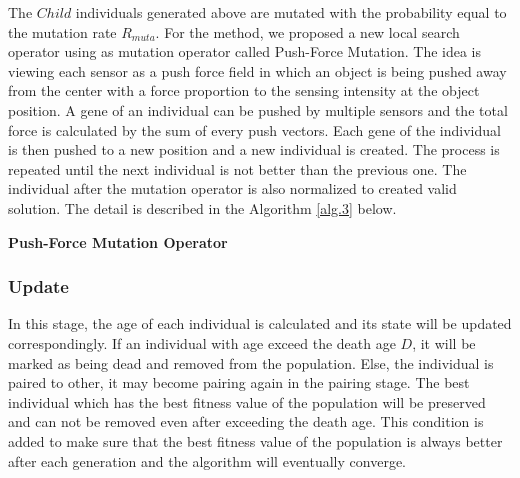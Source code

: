 \documentclass[final]{elsarticle}
\begin{document}
The $Child$ individuals generated above are mutated with the probability equal to the mutation rate $R_{muta}$. For the method, we proposed a new local search operator using as mutation operator called Push-Force Mutation. The idea is viewing each sensor as a push force field in which an object is being pushed away from the center with a force proportion to the sensing intensity at the object position. A gene of an individual can be pushed by multiple sensors and the total force is calculated by the sum of every push vectors. Each gene of the individual is then pushed to a new position and a new individual is created. The process is repeated until the next individual is not better than the previous one. The individual after the mutation operator is also normalized to created valid solution. The detail is described in the Algorithm \ref{alg.3} below.
\begin{algorithm}[H]
	\SetAlgoLined
	\caption{\textbf{Push-Force Mutation Operator}} 
	\label{alg.3}
\end{algorithm} 

\subsubsection{Update}

In this stage, the age of each individual is calculated and its state will be updated correspondingly. If an individual with age exceed the death age $D$, it will be marked as being dead and removed from the population. Else, the individual is paired to other, it may become pairing again in the pairing stage. The best individual which has the best fitness value of the population will be preserved and can not be removed even after exceeding the death age. This condition is added to make sure that the best fitness value of the population is always better after each generation and the algorithm will eventually converge.
\end{document}
